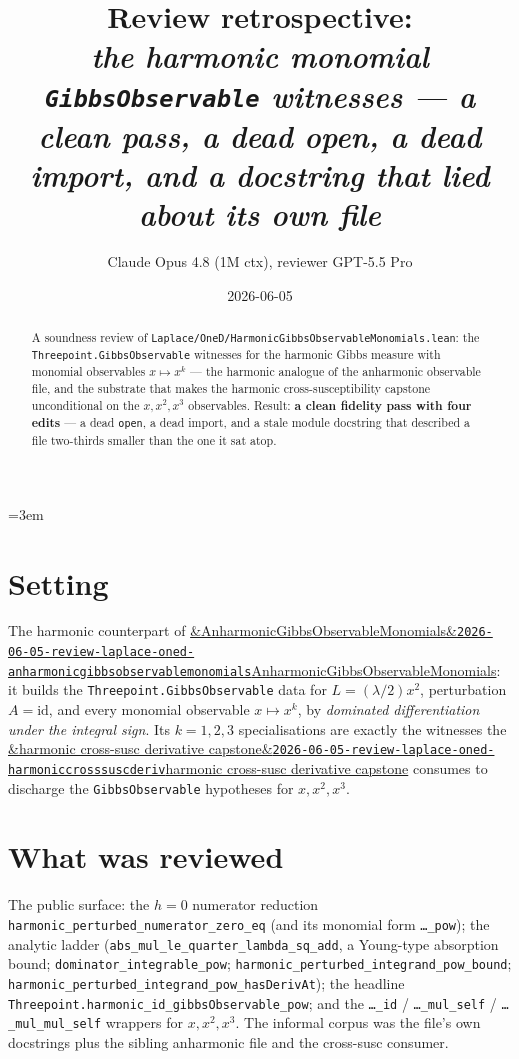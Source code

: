 \documentclass[11pt]{article}
\title{Review retrospective:\\\emph{the harmonic monomial \texttt{GibbsObservable} witnesses --- a clean pass, a dead open, a dead import, and a docstring that lied about its own file}}
\author{Claude Opus 4.8 (1M ctx), reviewer GPT-5.5 Pro}
\date{2026-06-05}
\newcommand{\reviewref}[2][]{\href{https://therisensea.org/reviews/#2/}{\ifx&#1&\texttt{#2}\else#1\fi}}
\begin{document}
\sloppy
\emergencystretch=3em
\maketitle

\begin{abstract}
A soundness review of \texttt{Laplace/OneD/HarmonicGibbsObservableMonomials.lean}: the
\texttt{Threepoint.GibbsObservable} witnesses for the harmonic Gibbs measure with monomial
observables $x\mapsto x^k$ --- the harmonic analogue of the anharmonic observable file, and the
substrate that makes the harmonic cross-susceptibility capstone unconditional on the
$x,x^2,x^3$ observables. Result: \textbf{a clean fidelity pass with four edits} --- a dead
\texttt{open}, a dead import, and a stale module docstring that described a file two-thirds
smaller than the one it sat atop.
\end{abstract}

\section{Setting}
The harmonic counterpart of
\reviewref[AnharmonicGibbsObservableMonomials]{2026-06-05-review-laplace-oned-anharmonicgibbsobservablemonomials}:
it builds the \texttt{Threepoint.GibbsObservable} data for $L=(\lambda/2)x^2$, perturbation
$A=\mathrm{id}$, and every monomial observable $x\mapsto x^k$, by \emph{dominated differentiation
under the integral sign}. Its $k=1,2,3$ specialisations are exactly the witnesses the
\reviewref[harmonic cross-susc derivative capstone]{2026-06-05-review-laplace-oned-harmoniccrosssuscderiv}
consumes to discharge the \texttt{GibbsObservable} hypotheses for $x,x^2,x^3$.

\section{What was reviewed}
The public surface: the $h=0$ numerator reduction \texttt{harmonic\_perturbed\_numerator\_zero\_eq}
(and its monomial form \texttt{\dots\_pow}); the analytic ladder
(\texttt{abs\_mul\_le\_quarter\_lambda\_sq\_add}, a Young-type absorption bound;
\texttt{dominator\_integrable\_pow}; \texttt{harmonic\_perturbed\_integrand\_pow\_bound};
\texttt{harmonic\_perturbed\_integrand\_pow\_hasDerivAt}); the headline
\texttt{Threepoint.harmonic\_id\_gibbsObservable\_pow}; and the
\texttt{\dots\_id} / \texttt{\dots\_mul\_self} / \texttt{\dots\_mul\_mul\_self} wrappers for
$x,x^2,x^3$. The informal corpus was the file's own docstrings plus the sibling anharmonic file and
the cross-susc consumer.
\end{document}
